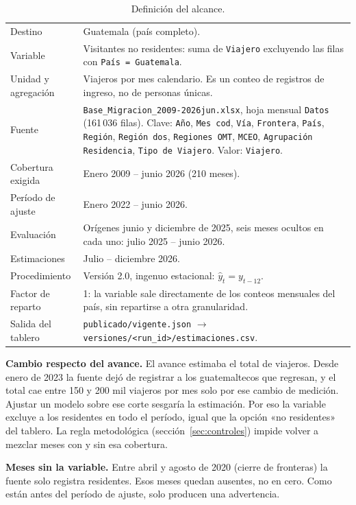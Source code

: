 \documentclass[11pt,letterpaper]{article}
\begin{document}
\begin{table}[H]
\centering\small
\caption{Definición del alcance.}
\begin{tabularx}{\textwidth}{@{}p{3.6cm}Y@{}}
\toprule
Destino & Guatemala (país completo). \\
Variable & Visitantes no residentes: suma de \texttt{Viajero} excluyendo las filas con \texttt{País = Guatemala}. \\
Unidad y agregación & Viajeros por mes calendario. Es un conteo de registros de ingreso, no de personas únicas. \\
Fuente & \texttt{Base\_Migracion\_2009-2026jun.xlsx}, hoja mensual \texttt{Datos} (161\,036 filas). Clave: \texttt{Año}, \texttt{Mes cod}, \texttt{Vía}, \texttt{Frontera}, \texttt{País}, \texttt{Región}, \texttt{Región dos}, \texttt{Regiones OMT}, \texttt{MCEO}, \texttt{Agrupación Residencia}, \texttt{Tipo de Viajero}. Valor: \texttt{Viajero}. \\
Cobertura exigida & Enero 2009 -- junio 2026 (210 meses). \\
Período de ajuste & Enero 2022 -- junio 2026. \\
Evaluación & Orígenes junio y diciembre de 2025, seis meses ocultos en cada uno: julio 2025 -- junio 2026. \\
Estimaciones & Julio -- diciembre 2026. \\
Procedimiento & Versión 2.0, ingenuo estacional: $\hat y_t = y_{t-12}$. \\
Factor de reparto & 1: la variable sale directamente de los conteos mensuales del país, sin repartirse a otra granularidad. \\
Salida del tablero & \texttt{publicado/vigente.json} $\rightarrow$ \texttt{versiones/<run\_id>/estimaciones.csv}. \\
\bottomrule
\end{tabularx}
\end{table}

\textbf{Cambio respecto del avance.} El avance estimaba el total de viajeros. Desde enero de 2023 la fuente dejó de registrar a los guatemaltecos que regresan, y el total cae entre 150 y 200 mil viajeros por mes solo por ese cambio de medición. Ajustar un modelo sobre ese corte sesgaría la estimación. Por eso la variable excluye a los residentes en todo el período, igual que la opción «no residentes» del tablero. La regla metodológica (sección~\ref{sec:controles}) impide volver a mezclar meses con y sin esa cobertura.

\textbf{Meses sin la variable.} Entre abril y agosto de 2020 (cierre de fronteras) la fuente solo registra residentes. Esos meses quedan ausentes, no en cero. Como están antes del período de ajuste, solo producen una advertencia.
\end{document}
